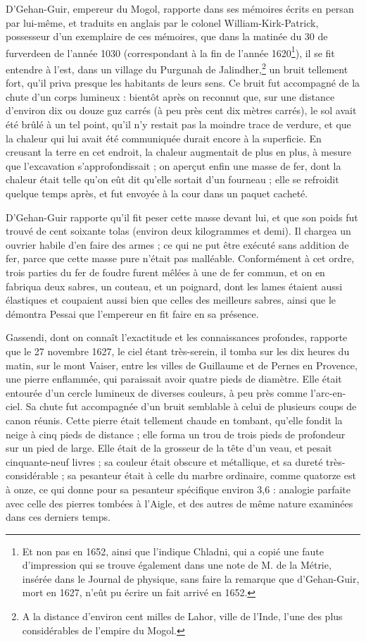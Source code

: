 \documentclass[a4paper, 12pt, oneside, french]{article}
\begin{document}
D'Gehan-Guir, empereur du Mogol, rapporte dans ses mémoires écrits en persan par lui-même, et traduits en anglais par le colonel William-Kirk-Patrick, possesseur d'un exemplaire de ces mémoires, que dans la matinée du 30 de furverdeen de l'année 1030 (correspondant à la fin de l'année 1620\footnote{Et non pas en 1652, ainsi que l'indique Chladni, qui a copié une faute d'impression qui se trouve également dans une note de M. de la Métrie, insérée dans le Journal de physique, sans faire la remarque que d'Gehan-Guir, mort en 1627, n'eût pu écrire un fait arrivé en 1652.}), il se fit entendre à l'est, dans un village du Purgunah de Jalindher,\footnote{A la distance d'environ cent milles de Lahor, ville de l'Inde, l'une des plus considérables de l'empire du Mogol.} un bruit tellement fort, qu'il priva presque les habitants de leurs sens. Ce bruit fut accompagné de la chute d'un corps lumineux : bientôt après on reconnut que, sur une distance d'environ dix ou douze guz carrés (à peu près cent dix mètres carrés), le sol avait été brûlé à un tel point, qu'il n'y restait pas la moindre trace de verdure, et que la chaleur qui lui avait été communiquée durait encore à la superficie. En creusant la terre en cet endroit, la chaleur augmentait de plus en plus, à mesure que l'excavation s'approfondissait ; on aperçut enfin une masse de fer, dont la chaleur était telle qu'on eût dit qu'elle sortait d'un fourneau ; elle se refroidit quelque temps après, et fut envoyée à la cour dans un paquet cacheté.

D'Gehan-Guir rapporte qu'il fit peser cette masse devant lui, et que son poids fut trouvé de cent soixante tolas (environ deux kilogrammes et demi). Il chargea un ouvrier habile d'en faire des armes ; ce qui ne put être exécuté sans addition de fer, parce que cette masse pure n'était pas malléable. Conformément à cet ordre, trois parties du fer de foudre furent mêlées à une de fer commun, et on en fabriqua deux sabres, un couteau, et un poignard, dont les lames étaient aussi élastiques et coupaient aussi bien que celles des meilleurs sabres, ainsi que le démontra Pessai que l'empereur en fit faire en sa présence.

Gassendi, dont on connaît l'exactitude et les connaissances profondes, rapporte que le 27 novembre 1627, le ciel étant très-serein, il tomba sur les dix heures du matin, sur le mont Vaiser, entre les villes de Guillaume et de Pernes en Provence, une pierre enflammée, qui paraissait avoir quatre pieds de diamètre. Elle était entourée d'un cercle lumineux de diverses couleurs, à peu près comme l'arc-en-ciel. Sa chute fut accompagnée d'un bruit semblable à celui de plusieurs coups de canon réunis. Cette pierre était tellement chaude en tombant, qu'elle fondit la neige à cinq pieds de distance ; elle forma un trou de trois pieds de profondeur sur un pied de large. Elle était de la grosseur de la tête d'un veau, et pesait cinquante-neuf livres ; sa couleur était obscure et métallique, et sa dureté très-considérable ; sa pesanteur était à celle du marbre ordinaire, comme quatorze est à onze, ce qui donne pour sa pesanteur spécifique environ 3,6 : analogie parfaite avec celle des pierres tombées à l'Aigle, et des autres de même nature examinées dans ces derniers temps.
\end{document}
